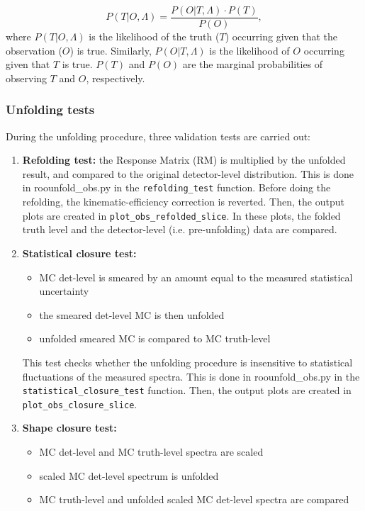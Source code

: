 \documentclass[12pt]{article}
\begin{document}
\begin{equation}
P(T|O,\Lambda) = \frac{P(O|T,\Lambda) \cdot P(T)}{P(O)},
\end{equation}
where $P(T|O,\Lambda)$ is the likelihood of the truth ($T$) occurring given that the observation ($O$) is true.
Similarly, $P(O|T,\Lambda)$ is the likelihood of $O$ occurring given that $T$ is true.
$P(T)$ and $P(O)$ are the marginal probabilities of observing $T$ and $O$, respectively.

\subsubsection{Unfolding tests}

During the unfolding procedure, three validation tests are carried out:

\begin{enumerate}
\item {\bf Refolding test:} the Response Matrix (RM) is multiplied by the unfolded result, and compared to the original detector-level distribution.
This is done in roounfold\_obs.py in the \verb|refolding_test| function. Before doing the refolding, the kinematic-efficiency correction is reverted.
Then, the output plots are created in \verb|plot_obs_refolded_slice|. In these plots, the folded truth level and the detector-level (i.e. pre-unfolding) data are compared.

\item {\bf Statistical closure test:}

\begin{itemize}
\item MC det-level is smeared by an amount equal to the measured statistical uncertainty
\item the smeared det-level MC is then unfolded
\item unfolded smeared MC is compared to MC truth-level
\end{itemize}

This test checks whether the unfolding procedure is insensitive to statistical fluctuations of the measured spectra.
This is done in roounfold\_obs.py in the \verb|statistical_closure_test| function.
Then, the output plots are created in \verb|plot_obs_closure_slice|.

\item {\bf Shape closure test:}

\begin{itemize}
\item MC det-level and MC truth-level spectra are scaled
\item scaled MC det-level spectrum is unfolded
\item MC truth-level and unfolded scaled MC det-level spectra are compared
\end{itemize}


\end{enumerate}
\end{document}
